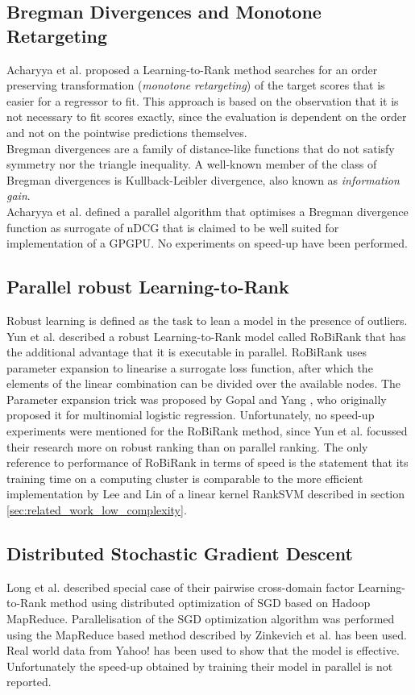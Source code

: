 \subsection{Bregman Divergences and Monotone Retargeting}
Acharyya et al. \cite{Acharyya2012, Acharyya2013} proposed a Learning-to-Rank method searches for an order preserving transformation (\emph{monotone retargeting}) of the target scores that is easier for a regressor to fit. This approach is based on the observation that it is not necessary to fit scores exactly, since the evaluation is dependent on the order and not on the pointwise predictions themselves.\\

Bregman divergences are a family of distance-like functions that do not satisfy symmetry nor the triangle inequality. A well-known member of the class of Bregman divergences is Kullback-Leibler divergence, also known as \emph{information gain}.\\

Acharyya et al. \cite{Acharyya2012, Acharyya2013} defined a parallel algorithm that optimises a Bregman divergence function as surrogate of \ac{nDCG} that is claimed to be well suited for implementation of a \ac{GPGPU}. No experiments on speed-up have been performed.
\subsection{Parallel robust Learning-to-Rank}
Robust learning \cite{Huber1981} is defined as the task to lean a model in the presence of outliers. Yun et al. described a \cite{Yun2014} robust Learning-to-Rank model called RoBiRank that has the additional advantage that it is executable in parallel. RoBiRank uses parameter expansion to linearise a surrogate loss function, after which the elements of the linear combination can be divided over the available nodes. The Parameter expansion trick was proposed by Gopal and Yang \cite{Gopal2013}, who originally proposed it for multinomial logistic regression. Unfortunately, no speed-up experiments were mentioned for the RoBiRank method, since Yun et al. focussed their research more on robust ranking than on parallel ranking. The only reference to performance of RoBiRank in terms of speed is the statement that its training time on a computing cluster is comparable to the more efficient implementation by Lee and Lin \cite{Lee2014} of a linear kernel RankSVM \cite{Herbrich1999, Joachims2002} described in section \ref{sec:related_work_low_complexity}.
\subsection{Distributed Stochastic Gradient Descent}
Long et al. \cite{Long2012} described special case of their pairwise cross-domain factor Learning-to-Rank method using distributed optimization of \ac{SGD} based on Hadoop MapReduce. Parallelisation of the \ac{SGD} optimization algorithm was performed using the MapReduce based method described by  Zinkevich et al. \cite{Zinkevich2010} has been used. Real world data from Yahoo! has been used to show that the model is effective. Unfortunately the speed-up obtained by training their model in parallel is not reported.\\

